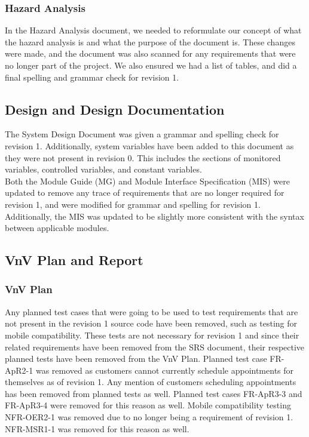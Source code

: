 \documentclass{article}
\begin{document}
\subsubsection{Hazard Analysis}

In the Hazard Analysis document, we needed to reformulate our concept of what the hazard analysis is and what the purpose of the document is. These changes were made, and the document was also scanned for any requirements that were no longer part of the project. We also ensured we had a list of tables, and did a final spelling and grammar check for revision 1.

\subsection{Design and Design Documentation}

The System Design Document was given a grammar and spelling check for revision 1. Additionally, system variables have been added to this document as they were not present in revision 0. This includes the sections of monitored variables, controlled variables, and constant variables.\\

\noindent Both the Module Guide (MG) and Module Interface Specification (MIS) were updated to remove any trace of requirements that are no longer required for revision 1, and were modified for grammar and spelling for revision 1. Additionally, the MIS was updated to be slightly more consistent with the syntax between applicable modules.

\subsection{VnV Plan and Report}

\subsubsection{VnV Plan}

Any planned test cases that were going to be used to test requirements that are not present in the revision 1 source code have been removed, such as testing for mobile compatibility. These tests are not necessary for revision 1 and since their related requirements have been removed from the SRS document, their respective planned tests have been removed from the VnV Plan. Planned test case FR-ApR2-1 was removed as customers cannot currently schedule appointments for themselves as of revision 1. Any mention of customers scheduling appointments has been removed from planned tests as well. Planned test cases FR-ApR3-3 and FR-ApR3-4 were removed for this reason as well. Mobile compatibility testing NFR-OER2-1 was removed due to no longer being a requirement of revision 1. NFR-MSR1-1 was removed for this reason as well.\\
\end{document}
